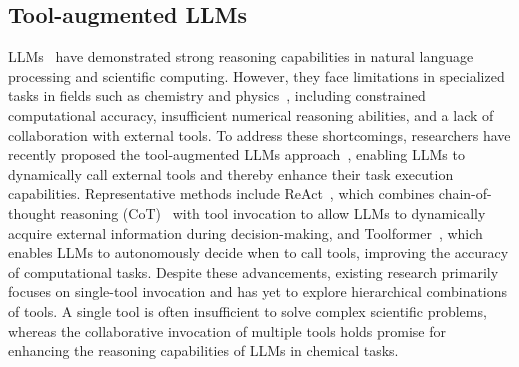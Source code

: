 \subsection{Tool-augmented LLMs}
LLMs~\cite{anil2023palm,achiam2023gpt,touvron2023llama} have demonstrated strong reasoning capabilities in natural language processing and scientific computing. However, they face limitations in specialized tasks in fields such as chemistry and physics~\cite{yang2024moosechemlargelanguagemodels}, including constrained computational accuracy, insufficient numerical reasoning abilities, and a lack of collaboration with external tools. To address these shortcomings, researchers have recently proposed the tool-augmented LLMs approach~\cite{qin2023toolllmfacilitatinglargelanguage,wang2024gtabenchmarkgeneraltool,yang2023autogptonlinedecisionmaking}, enabling LLMs to dynamically call external tools and thereby enhance their task execution capabilities.
Representative methods include ReAct~\cite{yao2023reactsynergizingreasoningacting}, which combines chain-of-thought reasoning (CoT)~\cite{wei2023chainofthoughtpromptingelicitsreasoning} with tool invocation to allow LLMs to dynamically acquire external information during decision-making, and Toolformer~\cite{schick2023toolformerlanguagemodelsteach}, which enables LLMs to autonomously decide when to call tools, improving the accuracy of computational tasks. 
Despite these advancements, existing research primarily focuses on single-tool invocation and has yet to explore hierarchical combinations of tools. A single tool is often insufficient to solve complex scientific problems, whereas the collaborative invocation of multiple tools holds promise for enhancing the reasoning capabilities of LLMs in chemical tasks.